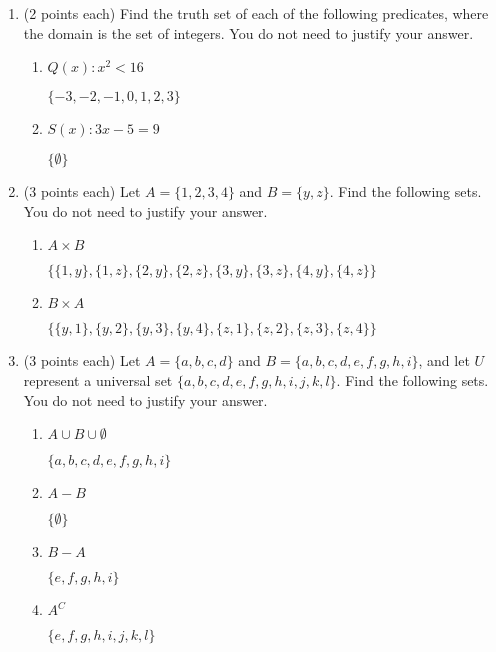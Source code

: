 \documentclass[11pt]{article}
\newcommand{\pte}[1]{\textcolor{maincolor}{(#1 points each)}}
\begin{document}
\begin{justify}
\begin{enumerate}
\item \pte{2} Find the truth set of each of the following predicates, where the
domain is the set of integers. You do not need to justify your answer.
\begin{enumerate}
\item $Q(x): x^2 < 16$
\begin{mdframed}
    $\{-3, -2, -1, 0, 1, 2, 3\}$
\end{mdframed}
\item $S(x): 3x - 5 = 9$
\begin{mdframed}
    $\{\emptyset\}$
\end{mdframed}
\end{enumerate}
\item \pte{3} Let $A = \{1, 2, 3, 4\}$ and $B = \{y,z\}$. Find the following
sets. You do not need to justify your answer.
\begin{enumerate}
\item $A \times B$
\begin{mdframed}
    $\{\{1, y\}, \{1, z\}, \{2, y\}, \{2, z\}, \{3, y\}, \{3, z\}, \{4, y\}, \{4, z\}\}$
\end{mdframed}
\item $B \times A$
\begin{mdframed}
    $\{\{y, 1\}, \{y, 2\}, \{y, 3\}, \{y, 4\}, \{z, 1\}, \{z, 2\}, \{z, 3\}, \{z, 4\}\}$
\end{mdframed}
\end{enumerate}
\newpage
\item \pte{3} Let $A = \{a,b,c,d\} $ and $B = \{a,b,c,d,e,f,g,h,i\}$, and let
$U$ represent a universal set $\{a,b,c,d,e,f,g,h,i,j,k,l\}$. Find the following
sets. You do not need to justify your answer.
\begin{enumerate}
\item $A \cup B \cup \emptyset$
\begin{mdframed}
    $\{a, b, c, d, e, f, g, h, i\}$
\end{mdframed}
\item $A - B$
\begin{mdframed}
    $\{\emptyset\} $
\end{mdframed}
\item $B - A$
\begin{mdframed}
    $\{e, f, g, h, i\}$
\end{mdframed}
\item $A^C$
\begin{mdframed}
    $\{e, f, g, h, i, j, k, l\}$
\end{mdframed}

\end{enumerate}
\end{enumerate}
\end{justify}
\end{document}
